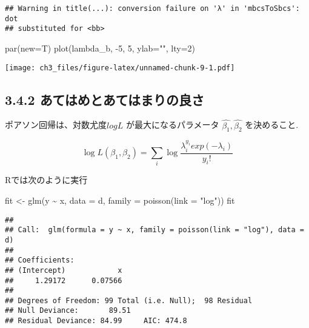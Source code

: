 \documentclass[
]{article}
\newenvironment{Shaded}{\begin{snugshade}}{\end{snugshade}}
\newcommand{\AttributeTok}[1]{\textcolor[rgb]{0.77,0.63,0.00}{#1}}
\newcommand{\DecValTok}[1]{\textcolor[rgb]{0.00,0.00,0.81}{#1}}
\newcommand{\FunctionTok}[1]{\textcolor[rgb]{0.00,0.00,0.00}{#1}}
\newcommand{\NormalTok}[1]{#1}
\newcommand{\OtherTok}[1]{\textcolor[rgb]{0.56,0.35,0.01}{#1}}
\newcommand{\SpecialCharTok}[1]{\textcolor[rgb]{0.00,0.00,0.00}{#1}}
\newcommand{\StringTok}[1]{\textcolor[rgb]{0.31,0.60,0.02}{#1}}
\begin{document}
\begin{verbatim}
## Warning in title(...): conversion failure on 'λ' in 'mbcsToSbcs': dot
## substituted for <bb>
\end{verbatim}

\begin{Shaded}
\begin{Highlighting}[]
\FunctionTok{par}\NormalTok{(}\AttributeTok{new=}\NormalTok{T)}
\FunctionTok{plot}\NormalTok{(lambda\_b, }\SpecialCharTok{{-}}\DecValTok{5}\NormalTok{, }\DecValTok{5}\NormalTok{, }\AttributeTok{ylab=}\StringTok{""}\NormalTok{, }\AttributeTok{lty=}\DecValTok{2}\NormalTok{)}
\end{Highlighting}
\end{Shaded}

\texttt{[image: ch3\_files/figure-latex/unnamed-chunk-9-1.pdf]}

\hypertarget{ux3042ux3066ux306fux3081ux3068ux3042ux3066ux306fux307eux308aux306eux826fux3055}{%
\subsection{3.4.2
あてはめとあてはまりの良さ}\label{ux3042ux3066ux306fux3081ux3068ux3042ux3066ux306fux307eux308aux306eux826fux3055}}

ポアソン回帰は、対数尤度\(logL\) が最大になるパラメータ
\(\hat{\beta_1}, \hat{\beta_2}\) を決めること.

\[
  \log L(\beta_1, \beta_2) = \sum_{i} \log \frac{\lambda_i^{y_i} exp(-\lambda_i)}{y_i !}
\]

Rでは次のように実行

\begin{Shaded}
\begin{Highlighting}[]
\NormalTok{fit }\OtherTok{\textless{}{-}} \FunctionTok{glm}\NormalTok{(y }\SpecialCharTok{\textasciitilde{}}\NormalTok{ x, }\AttributeTok{data =}\NormalTok{ d, }\AttributeTok{family =} \FunctionTok{poisson}\NormalTok{(}\AttributeTok{link =} \StringTok{"log"}\NormalTok{))}
\NormalTok{fit}
\end{Highlighting}
\end{Shaded}

\begin{verbatim}
## 
## Call:  glm(formula = y ~ x, family = poisson(link = "log"), data = d)
## 
## Coefficients:
## (Intercept)            x  
##     1.29172      0.07566  
## 
## Degrees of Freedom: 99 Total (i.e. Null);  98 Residual
## Null Deviance:       89.51 
## Residual Deviance: 84.99     AIC: 474.8
\end{verbatim}
\end{document}
